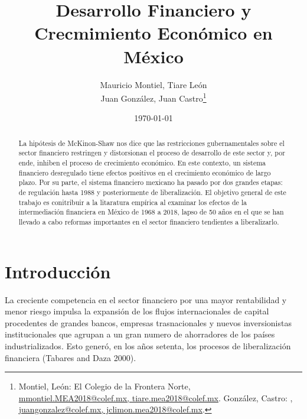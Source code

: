 \documentclass[]{AEA}
\begin{document}
\title{Desarrollo Financiero y Crecmimiento Económico en México}



\author{
  Mauricio Montiel, Tiare León\\
  Juan González, Juan Castro\thanks{
  Montiel, León: El Colegio de la Frontera Norte, \href{mailto:mmontiel.MEA2018@colef.mx, tiare.mea2018@colef.mx}{mmontiel.MEA2018@colef.mx, tiare.mea2018@colef.mx}.
  González, Castro: , \href{mailto:juangonzalez@colef.mx, jclimon.mea2018@colef.mx}{juangonzalez@colef.mx, jclimon.mea2018@colef.mx}.
}
}

\date{\today}
\pubVolume{}
\pubIssue{}

\begin{abstract}
La hipótesis de McKinon-Shaw nos dice que las restricciones
gubernamentales sobre el sector financiero restringen y distorsionan el
proceso de desarrollo de este sector y, por ende, inhiben el proceso de
crecimiento económico. En este contexto, un sistema financiero
desregulado tiene efectos positivos en el crecimiento económico de largo
plazo. Por su parte, el sistema financiero mexicano ha pasado por dos
grandes etapas: de regulación hasta 1988 y posteriormente de
liberalización. El objetivo general de este trabajo es conitribuir a la
litaratura empírica al examinar los efectos de la intermediación
financiera en México de 1968 a 2018, lapso de 50 años en el que se han
llevado a cabo reformas importantes en el sector financiero tendientes a
liberalizarlo.
\end{abstract}


\maketitle

\section{Introducción}

La creciente competencia en el sector financiero por una mayor
rentabilidad y menor riesgo impulsa la expansión de los flujos
internacionales de capital procedentes de grandes bancos, empresas
trasnacionales y nuevos inversionistas institucionales que agrupan a un
gran numero de ahorradores de los países industrializados. Esto generó,
en los años setenta, los procesos de liberalización financiera (Tabares
and Daza 2000).
\end{document}
